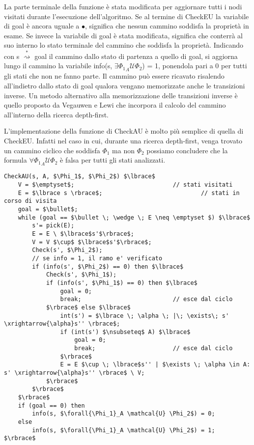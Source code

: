 La parte terminale della funzione è stata modificata per aggiornare tutti i nodi visitati durante l'esecuzione dell'algoritmo.
Se al termine di CheckEU la variabile di goal è ancora uguale a $\bullet$, significa che nessun cammino soddisfa la proprietà in esame. Se invece la variabile di goal è stata modificata, significa che conterrà al suo interno lo stato terminale del cammino che soddisfa la proprietà. Indicando con  s $\stackrel{*}{\rightsquigarrow}$ goal il cammino dallo stato di partenza a quello di goal, si aggiorna lungo il cammino la variabile info(s, $\exists{\Phi_1}_A \mathcal{U} \Phi_2$) = 1, ponendola pari a 0 per tutti gli stati che non ne fanno parte.
Il cammino può essere ricavato risalendo all'indietro dallo stato di goal qualora vengano memorizzate anche le transizioni inverse.
Un metodo alternativo alla memorizzazione delle transizioni inverse è quello proposto da Vegauwen e Lewi \cite{ALMC} che incorpora il calcolo del cammino all'interno della ricerca depth-first.

L'implementazione della funzione di CheckAU è molto più semplice di quella di CheckEU. Infatti nel caso in cui, durante una ricerca depth-first, venga trovato un cammino ciclico che soddisfa $\Phi_1$ ma non $\Phi_2$ possiamo concludere che la formula $\forall{\Phi_1}_A \mathcal{U} \Phi_2$ è falsa per tutti gli stati analizzati.
\\
\begin{lstlisting}[mathescape, caption=Implementazione di CheckAU]
CheckAU(s, A, $\Phi_1$, $\Phi_2$) $\lbrace$
	V = $\emptyset$; 							// stati visitati
	E = $\lbrace s \rbrace$; 							// stati in corso di visita
	goal = $\bullet$;
	while (goal == $\bullet \; \wedge \; E \neq \emptyset $) $\lbrace$
		s'= pick(E);
		E = E \ $\lbrace$s'$\rbrace$;
		V = V $\cup$ $\lbrace$s'$\rbrace$;
		Check(s', $\Phi_2$);
		// se info = 1, il ramo e' verificato
		if (info(s', $\Phi_2$) == 0) then $\lbrace$
			Check(s', $\Phi_1$);
			if (info(s', $\Phi_1$) == 0) then $\lbrace$
				goal = 0;
				break;							// esce dal ciclo
			$\rbrace$ else $\lbrace$
				int(s') = $\lbrace \; \alpha \; |\; \exists\; s' \xrightarrow{\alpha}s'' \rbrace$;
				if (int(s') $\nsubseteq$ A) $\lbrace$
					goal = 0;
					break;						// esce dal ciclo
				$\rbrace$
				E = E $\cup \; \lbrace$s'' | $\exists \; \alpha \in A: s' \xrightarrow{\alpha}s'' \rbrace$ \ V;
			$\rbrace$	
		$\rbrace$
	$\rbrace$
	if (goal == 0) then
		info(s, $\forall{\Phi_1}_A \mathcal{U} \Phi_2$) = 0;
	else
		info(s, $\forall{\Phi_1}_A \mathcal{U} \Phi_2$) = 1;
$\rbrace$
\end{lstlisting}

